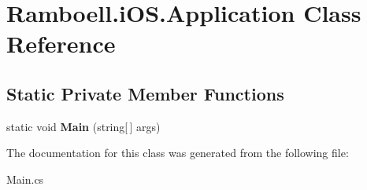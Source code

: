 \hypertarget{class_ramboell_1_1i_o_s_1_1_application}{}\section{Ramboell.\+i\+O\+S.\+Application Class Reference}
\label{class_ramboell_1_1i_o_s_1_1_application}
\subsection*{Static Private Member Functions}
\begin{DoxyCompactItemize}
\item 
\mbox{\label{class_ramboell_1_1i_o_s_1_1_application_a4be02ce99f53ab64c7a4c92e90e2d2b4}} 
static void {\bfseries Main} (string\mbox{[}$\,$\mbox{]} args)
\end{DoxyCompactItemize}


The documentation for this class was generated from the following file\+:\begin{DoxyCompactItemize}
\item 
Main.\+cs\end{DoxyCompactItemize}
